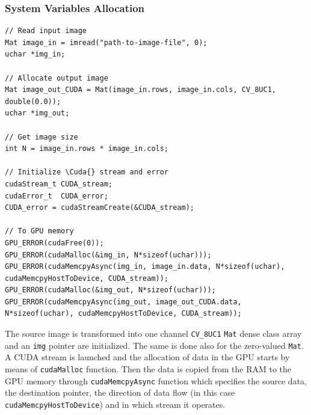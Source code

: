 \documentclass[12pt]{article}
\newcommand*{\Cuda}{\textsc{CUDA}}
\begin{document}
\subsubsection{System Variables Allocation}
%
\begin{lstlisting}
// Read input image
Mat image_in = imread("path-to-image-file", 0);
uchar *img_in;

// Allocate output image
Mat image_out_CUDA = Mat(image_in.rows, image_in.cols, CV_8UC1, double(0.0));
uchar *img_out;

// Get image size
int N = image_in.rows * image_in.cols;

// Initialize \Cuda{} stream and error
cudaStream_t CUDA_stream;
cudaError_t  CUDA_error;
CUDA_error = cudaStreamCreate(&CUDA_stream);

// To GPU memory
GPU_ERROR(cudaFree(0));
GPU_ERROR(cudaMalloc(&img_in, N*sizeof(uchar)));
GPU_ERROR(cudaMemcpyAsync(img_in, image_in.data, N*sizeof(uchar), cudaMemcpyHostToDevice, CUDA_stream));
GPU_ERROR(cudaMalloc(&img_out, N*sizeof(uchar)));
GPU_ERROR(cudaMemcpyAsync(img_out, image_out_CUDA.data, N*sizeof(uchar), cudaMemcpyHostToDevice, CUDA_stream));
\end{lstlisting}
%
The source image is transformed into one channel \texttt{CV\_8UC1} \texttt{Mat} dense class array and an \texttt{img} pointer are initialized. The same is done also for the zero-valued \texttt{Mat}. A \Cuda{} stream is launched and the allocation of data in the GPU starts by means of \texttt{cudaMalloc} function. Then the data is copied from the RAM to the GPU memory through \texttt{cudaMemcpyAsync} function which specifies the source data, the destination pointer, the direction of data flow (in this case \texttt{cudaMemcpyHostToDevice}) and in which stream it operates.
%
\end{document}
